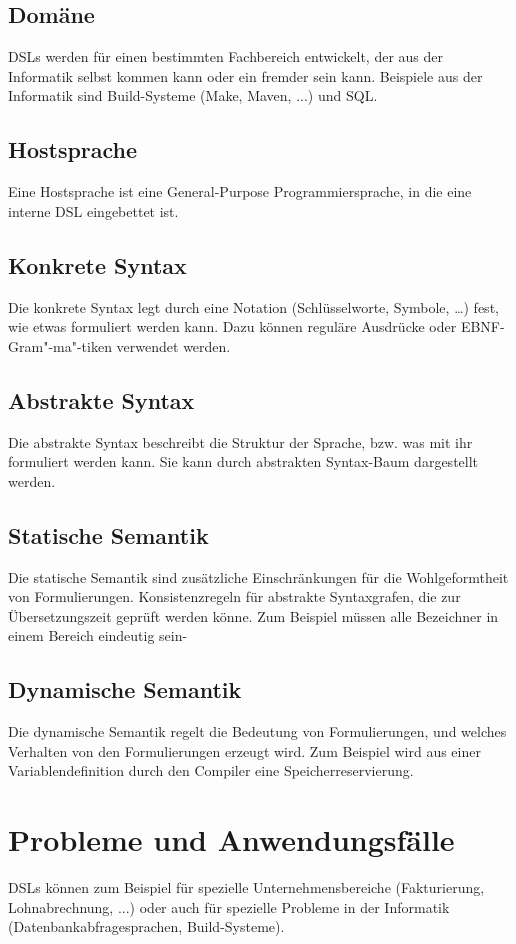 \documentclass[../InterneDSLs.tex]{subfiles}
\begin{document}
\subsection{Domäne}
DSLs werden für einen bestimmten Fachbereich entwickelt, der aus der Informatik selbst kommen kann oder ein fremder sein kann. Beispiele aus der Informatik sind Build-Systeme (Make, Maven, ...) und SQL.

\subsection{Hostsprache}
Eine Hostsprache ist eine General-Purpose Programmiersprache, in die eine interne DSL eingebettet ist.

\subsection{Konkrete Syntax}
Die konkrete Syntax legt durch eine Notation (Schlüsselworte, Symbole, \ldots) fest, wie etwas formuliert werden kann. Dazu können reguläre Ausdrücke oder EBNF-Gram"-ma"-tiken verwendet werden.

\subsection{Abstrakte Syntax}
Die abstrakte Syntax beschreibt die Struktur der Sprache, bzw. was mit ihr formuliert werden kann. Sie kann durch abstrakten Syntax-Baum dargestellt werden.

\subsection{Statische Semantik}
Die statische Semantik sind zusätzliche Einschränkungen für die Wohlgeformtheit von Formulierungen. Konsistenzregeln für abstrakte Syntaxgrafen, die zur Übersetzungszeit geprüft werden könne. Zum Beispiel müssen alle Bezeichner in einem Bereich eindeutig sein-

\subsection{Dynamische Semantik}
Die dynamische Semantik regelt die Bedeutung von Formulierungen, und welches Verhalten von den Formulierungen erzeugt wird. Zum Beispiel wird aus einer Variablendefinition durch den Compiler eine Speicherreservierung.


\section{Probleme und Anwendungsfälle}
DSLs können zum Beispiel für spezielle Unternehmensbereiche (Fakturierung, Lohnabrechnung, ...) oder auch für spezielle Probleme in der Informatik (Datenbankabfragesprachen, Build-Systeme).
\end{document}
